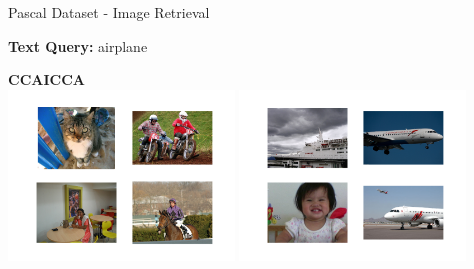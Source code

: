 \documentclass[8pt]{beamer}
\begin{document}
\begin{frame}{Pascal Dataset - Image Retrieval}

\textbf{Text Query: } airplane

\vspace{3ex}

\begin{center}
  \textbf{CCA}\hspace{32ex}\textbf{ICCA}\\[0.5ex]
  \includegraphics[width=0.45\textwidth]{figures/pascal_cca_ex.png}\hspace{2ex}
  \includegraphics[width=0.45\textwidth]{figures/pascal_icca_ex.png}
\end{center}



\end{frame}
\end{document}
